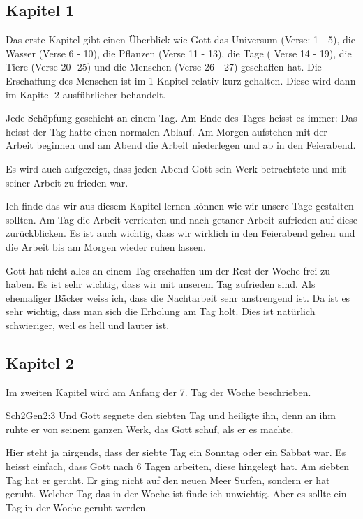 
\subsection{Kapitel 1}
Das erste Kapitel gibt einen Überblick wie Gott das Universum (Verse: 1 - 5), die Wasser (Verse 6 - 10), die Pflanzen (Verse 11 - 13), die Tage ( Verse 14 - 19), die Tiere (Verse 20 -25) und die Menschen (Verse 26 - 27) geschaffen hat. Die Erschaffung des Menschen ist im 1 Kapitel relativ kurz gehalten. Diese wird dann im Kapitel 2 ausführlicher behandelt.

Jede Schöpfung geschieht an einem Tag. Am Ende des Tages heisst es immer:  Das heisst der Tag hatte einen normalen Ablauf. Am Morgen aufstehen mit der Arbeit beginnen und am Abend die Arbeit niederlegen und ab in den Feierabend.

Es wird auch aufgezeigt, dass jeden Abend Gott sein Werk betrachtete und mit seiner Arbeit zu frieden war.

Ich finde das wir aus diesem Kapitel lernen können wie wir unsere Tage gestalten sollten. Am Tag die Arbeit verrichten und nach getaner Arbeit zufrieden auf diese zurückblicken. Es ist auch wichtig, dass wir wirklich in den Feierabend gehen und die Arbeit bis am Morgen wieder ruhen lassen.

Gott hat nicht alles an einem Tag erschaffen um der Rest der Woche frei zu haben. Es ist sehr wichtig, dass wir mit unserem Tag zufrieden sind. Als ehemaliger Bäcker weiss ich, dass die Nachtarbeit sehr anstrengend ist. Da ist es sehr wichtig, dass man sich die Erholung am Tag holt. Dies ist natürlich schwieriger, weil es hell und lauter ist.

\subsection{Kapitel 2}
Im zweiten Kapitel wird am Anfang der 7. Tag der Woche beschrieben.
\begin{bibeltext}{Sch2}{Gen}{2:3}
	Und Gott segnete den siebten Tag und heiligte ihn, denn an ihm ruhte er von seinem ganzen Werk, das Gott schuf, als er es machte.
\end{bibeltext}
Hier steht ja nirgends, dass der siebte Tag ein Sonntag oder ein Sabbat war. Es heisst einfach, dass Gott nach 6 Tagen arbeiten, diese hingelegt hat. Am siebten Tag hat er geruht. Er ging nicht auf den neuen Meer Surfen, sondern er hat geruht. Welcher Tag das in der Woche ist finde ich unwichtig. Aber es sollte ein Tag in der Woche geruht werden.

